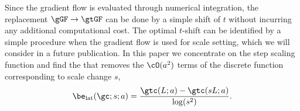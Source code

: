 Since the gradient flow is evaluated through numerical integration, the replacement $\gGF \to \gtGF$ can be done by a simple shift of $t$ without incurring any additional computational cost.
The optimal $t$-shift \topt can be identified by a simple procedure when the gradient flow is used for scale setting, which we will consider in a future publication.
In this paper we concentrate on the step scaling function and find the \topt that removes the $\cO(a^2)$ terms of the discrete \be function corresponding to scale change $s$,
\begin{equation}
  \label{eq:beta_lat}
  \be_{\rm lat}(\gc; s; a) = \frac{\gtc(L; a) - \gtc(sL; a)}{\log(s^2)}.
\end{equation}
